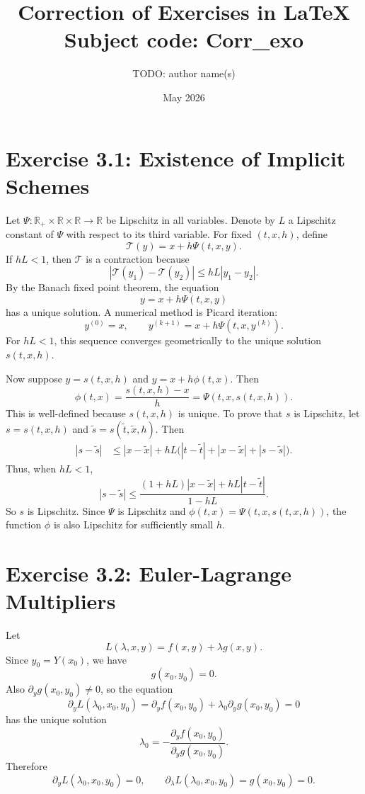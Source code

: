 \documentclass[11pt]{article}
\title{Correction of Exercises in LaTeX\\Subject code: Corr\_exo}
\author{TODO: author name(s)}
\date{May 2026}
\newcommand{\R}{\mathbb{R}}
\begin{document}
\maketitle

\section*{Exercise 3.1: Existence of Implicit Schemes}

Let $\Psi:\R_+\times\R\times\R\to\R$ be Lipschitz in all variables. Denote by $L$
a Lipschitz constant of $\Psi$ with respect to its third variable. For fixed
$(t,x,h)$, define
\[
    \mathcal T(y)=x+h\Psi(t,x,y).
\]
If $hL<1$, then $\mathcal T$ is a contraction because
\[
    |\mathcal T(y_1)-\mathcal T(y_2)|
    \le hL |y_1-y_2|.
\]
By the Banach fixed point theorem, the equation
\[
    y=x+h\Psi(t,x,y)
\]
has a unique solution. A numerical method is Picard iteration:
\[
    y^{(0)}=x,\qquad
    y^{(k+1)}=x+h\Psi(t,x,y^{(k)}).
\]
For $hL<1$, this sequence converges geometrically to the unique solution
$s(t,x,h)$.

Now suppose $y=s(t,x,h)$ and $y=x+h\phi(t,x)$. Then
\[
    \phi(t,x)=\frac{s(t,x,h)-x}{h}
             =\Psi(t,x,s(t,x,h)).
\]
This is well-defined because $s(t,x,h)$ is unique. To prove that $s$ is
Lipschitz, let $s=s(t,x,h)$ and $\tilde s=s(\tilde t,\tilde x,h)$. Then
\[
\begin{aligned}
|s-\tilde s|
&\le |x-\tilde x|
   + hL\bigl(|t-\tilde t|+|x-\tilde x|+|s-\tilde s|\bigr).
\end{aligned}
\]
Thus, when $hL<1$,
\[
    |s-\tilde s|
    \le
    \frac{(1+hL)|x-\tilde x|+hL|t-\tilde t|}{1-hL}.
\]
So $s$ is Lipschitz. Since $\Psi$ is Lipschitz and $\phi(t,x)=\Psi(t,x,s(t,x,h))$,
the function $\phi$ is also Lipschitz for sufficiently small $h$.

\section*{Exercise 3.2: Euler-Lagrange Multipliers}

Let
\[
    L(\lambda,x,y)=f(x,y)+\lambda g(x,y).
\]
Since $y_0=Y(x_0)$, we have
\[
    g(x_0,y_0)=0.
\]
Also $\partial_y g(x_0,y_0)\ne 0$, so the equation
\[
    \partial_y L(\lambda_0,x_0,y_0)
    =\partial_y f(x_0,y_0)+\lambda_0\partial_y g(x_0,y_0)=0
\]
has the unique solution
\[
    \lambda_0
    =
    -\frac{\partial_y f(x_0,y_0)}{\partial_y g(x_0,y_0)}.
\]
Therefore
\[
    \partial_y L(\lambda_0,x_0,y_0)=0,
    \qquad
    \partial_\lambda L(\lambda_0,x_0,y_0)=g(x_0,y_0)=0.
\]
\end{document}
